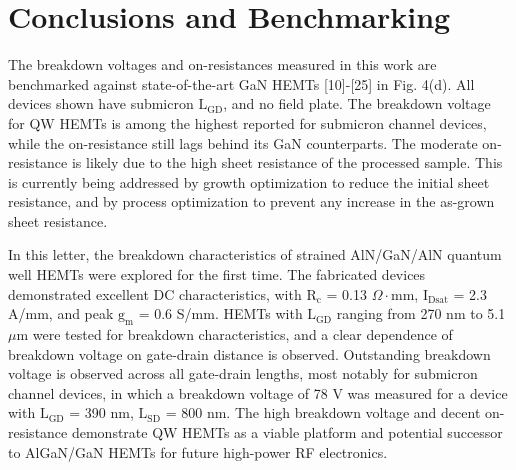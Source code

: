 \documentclass[journal]{IEEEtran}
\begin{document}
\section{Conclusions and Benchmarking}
The breakdown voltages and on-resistances measured in this work are benchmarked against state-of-the-art GaN HEMTs [10]-[25] in Fig. 4(d). All devices shown have submicron $\mathrm{L_{GD}}$, and no field plate. The breakdown voltage for QW HEMTs is among the highest reported for submicron channel devices, while the on-resistance still lags behind its GaN counterparts. The moderate on-resistance is likely due to the high sheet resistance of the processed sample. This is currently being addressed by growth optimization to reduce the initial sheet resistance, and by process optimization to prevent any increase in the as-grown sheet resistance.

In this letter, the breakdown characteristics of strained AlN/GaN/AlN quantum well HEMTs were explored for the first time. The fabricated devices demonstrated excellent DC characteristics, with $\mathrm{R_c}$ = 0.13 $\Omega\cdot$mm, $\mathrm{I_{Dsat}}$ = 2.3 A/mm, and peak $\mathrm{g_m}$ = 0.6 S/mm. HEMTs with $\mathrm{L_{GD}}$ ranging from 270 nm to 5.1 $\mu$m were tested for breakdown characteristics, and a clear dependence of breakdown voltage on gate-drain distance is observed. Outstanding breakdown voltage is observed across all gate-drain lengths, most notably for submicron channel devices, in which a breakdown voltage of 78 V was measured for a device with $\mathrm{L_{GD}}$ = 390 nm, $\mathrm{L_{SD}}$ = 800 nm. The high breakdown voltage and decent on-resistance demonstrate QW HEMTs as a viable platform and potential successor to AlGaN/GaN HEMTs for future high-power RF electronics.

\vfill

{\color{white}
\pagebreak
}


%
\end{document}
